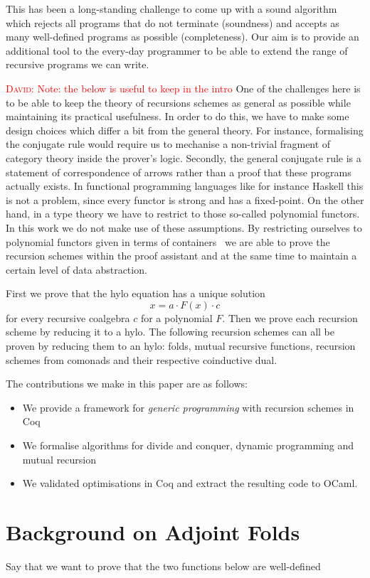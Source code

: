 \documentclass{article}
\newcommand{\dcas}[1]{\textcolor{red}{\textsc{David}: #1}}
\newcommand{\comp}{\cdot}
\begin{document}
This has been a long-standing challenge to come up with a sound algorithm which
rejects all programs that do not terminate (soundness) and accepts as many
well-defined programs as possible (completeness). Our aim is to provide an
additional tool to the every-day programmer to be able to extend the range of
recursive programs we can write.


\dcas{Note: the below is useful to keep in the intro}
One of the challenges here is to be able to keep the theory of recursions
schemes as general as possible while maintaining its practical usefulness. In
order to do this, we have to make some design choices which differ a bit from
the general theory.  For instance, formalising the conjugate rule would require
us to mechanise a non-trivial fragment of category theory inside the prover's
logic.  Secondly, the general conjugate rule is a statement of correspondence of
arrows rather than a proof that these programs actually exists. In functional
programming languages like for instance Haskell this is not a problem, since
every functor is strong and has a fixed-point.  On the other hand, in a type
theory we have to restrict to those so-called polynomial functors. In this work
we do not make use of these assumptions. By restricting ourselves to polynomial
functors given in terms of containers~\cite{AbbottAG05} we are able to prove the
recursion schemes within the proof assistant and at the same time to maintain a
certain level of data abstraction.

First we prove that the hylo equation has a unique solution
\[
  x = a \comp F(x) \comp c
\]
for every recursive coalgebra $c$ for a polynomial $F$. Then we prove each
recursion scheme by reducing it to a hylo. The following recursion schemes can
all be proven by reducing them to an hylo: folds, mutual recursive functions,
recursion schemes from comonads and their respective coinductive dual.

The contributions we make in this paper are as follows:
\begin{itemize}
  \item We provide a framework for \emph{generic programming} with recursion
schemes in Coq
  \item We formalise algorithms for divide and conquer, dynamic programming and
mutual recursion
  \item We validated optimisations in Coq and extract the resulting code to
OCaml.
\end{itemize}

\section{Background on Adjoint Folds}
Say that we want to prove that the two functions below are well-defined
\end{document}

